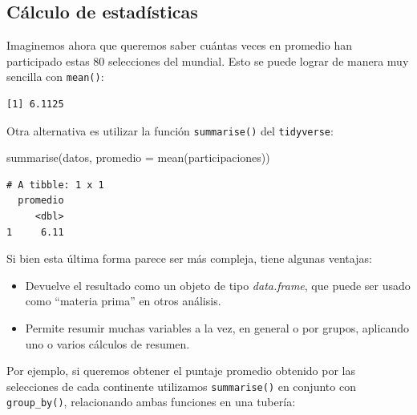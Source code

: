 \documentclass[
]{book}
\newenvironment{Shaded}{\begin{snugshade}}{\end{snugshade}}
\newcommand{\AttributeTok}[1]{\textcolor[rgb]{0.77,0.63,0.00}{#1}}
\newcommand{\FunctionTok}[1]{\textcolor[rgb]{0.00,0.00,0.00}{#1}}
\newcommand{\NormalTok}[1]{#1}
\newcommand{\SpecialCharTok}[1]{\textcolor[rgb]{0.00,0.00,0.00}{#1}}
\providecommand{\tightlist}{%
  \setlength{\itemsep}{0pt}\setlength{\parskip}{0pt}}
\begin{document}
\hypertarget{cuxe1lculo-de-estaduxedsticas}{%
\subsection{Cálculo de estadísticas}\label{cuxe1lculo-de-estaduxedsticas}}

Imaginemos ahora que queremos saber cuántas veces en promedio han participado estas 80 selecciones del mundial. Esto se puede lograr de manera muy sencilla con \texttt{mean()}:

\begin{Shaded}
\end{Shaded}

\begin{verbatim}
[1] 6.1125
\end{verbatim}

Otra alternativa es utilizar la función \texttt{summarise()} del \texttt{tidyverse}:

\begin{Shaded}
\begin{Highlighting}[]
\FunctionTok{summarise}\NormalTok{(datos, }\AttributeTok{promedio =} \FunctionTok{mean}\NormalTok{(participaciones))}
\end{Highlighting}
\end{Shaded}

\begin{verbatim}
# A tibble: 1 x 1
  promedio
     <dbl>
1     6.11
\end{verbatim}

Si bien esta última forma parece ser más compleja, tiene algunas ventajas:

\begin{itemize}
\tightlist
\item
  Devuelve el resultado como un objeto de tipo \emph{data.frame}, que puede ser usado como ``materia prima'' en otros análisis.
\item
  Permite resumir muchas variables a la vez, en general o por grupos, aplicando uno o varios cálculos de resumen.
\end{itemize}

Por ejemplo, si queremos obtener el puntaje promedio obtenido por las selecciones de cada continente utilizamos \texttt{summarise()} en conjunto con \texttt{group\_by()}, relacionando ambas funciones en una tubería:
\end{document}
